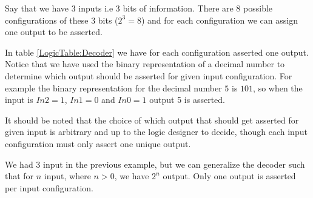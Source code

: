             Say that we have 3 inputs i.e 3 bits of information. There are 8 possible configurations of these 3 bits ($2^{3}=8$) and for each configuration we can assign one output to be asserted. 
            
            In table \ref{LogicTable:Decoder} we have for each configuration asserted one output. Notice that we have used the binary representation of a decimal number to determine which output should be asserted for given input configuration. For example the binary representation for the decimal number $5$ is $101$, so when the input is $In2=1$, $In1=0$ and $In0=1$ output 5 is asserted. 
            
            It should be noted that the choice of which output that should get asserted for given input is arbitrary and up to the logic designer to decide, though each input configuration must only assert one unique output.
            
            We had 3 input in the previous example, but we can generalize the decoder such that for $n$ input, where $n > 0$,  we have $2^{n}$ output. Only one output is asserted per input configuration. 
            

